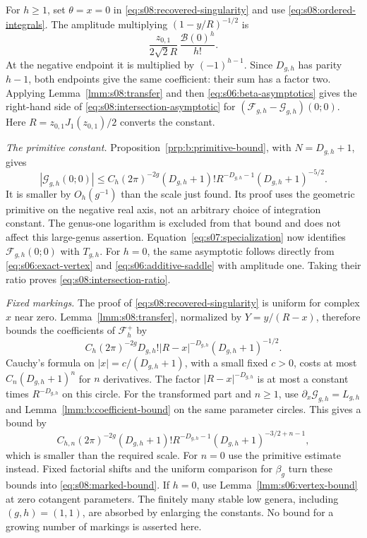 \begin{prf}
For $h\geq1$, set $\theta=x=0$ in
\eqref{eq:s08:recovered-singularity} and use
\eqref{eq:s08:ordered-integrals}. The amplitude multiplying
$(1-y/R)^{-1/2}$ is
\[
 \frac{z_{0,1}}{2\sqrt2 R}\,
                         \frac{\mathcal B(0)^h}{h!}.
\]
At the negative endpoint it is multiplied by $(-1)^{h-1}$.
Since $D_{g,h}$ has parity $h-1$, both endpoints give the same
coefficient: their sum has a factor two. Applying
Lemma~\ref{lmm:s08:transfer} and then
\eqref{eq:s06:beta-asymptotics} gives the right-hand side of
\eqref{eq:s08:intersection-asymptotic} for
$(\mathcal F_{g,h}-\mathcal G_{g,h})(0;0)$.
Here $R=z_{0,1}J_1(z_{0,1})/2$ converts the constant.

\smallskip\noindent
\emph{The primitive constant.}
Proposition~\ref{prp:b:primitive-bound}, with $N=D_{g,h}+1$, gives
\[
 |\mathcal G_{g,h}(0;0)|
 \leq C_h(2\pi)^{-2g}(D_{g,h}+1)!
                  R^{-D_{g,h}-1}(D_{g,h}+1)^{-5/2}.
\]
It is smaller by $O_h(g^{-1})$ than the scale just found.
Its proof uses the geometric primitive on the negative real axis,
not an arbitrary choice of integration constant. The genus-one
logarithm is excluded from that bound and does not affect this
large-genus assertion. Equation~\eqref{eq:s07:specialization}
now identifies $\mathcal F_{g,h}(0;0)$ with $T_{g,h}$.
For $h=0$, the same asymptotic follows directly from
\eqref{eq:s06:exact-vertex} and \eqref{eq:s06:additive-saddle}
with amplitude one. Taking their ratio proves
\eqref{eq:s08:intersection-ratio}.

\smallskip\noindent
\emph{Fixed markings.}
The proof of \eqref{eq:s08:recovered-singularity} is uniform for
complex $x$ near zero. Lemma~\ref{lmm:s08:transfer}, normalized by
$Y=y/(R-x)$, therefore bounds the coefficients of
$\mathcal F_h^+$ by
\[
 C_h(2\pi)^{-2g}D_{g,h}!|R-x|^{-D_{g,h}}
                                      (D_{g,h}+1)^{-1/2}.
\]
Cauchy's formula on $|x|=c/(D_{g,h}+1)$, with a small fixed
$c>0$, costs at most $C_n(D_{g,h}+1)^n$ for $n$ derivatives.
The factor $|R-x|^{-D_{g,h}}$ is at most a constant times
$R^{-D_{g,h}}$ on this circle. For the transformed part and
$n\geq1$, use $\partial_x\mathcal G_{g,h}=L_{g,h}$ and
Lemma~\ref{lmm:b:coefficient-bound} on the same parameter circles.
This gives a bound by
\[
 C_{h,n}(2\pi)^{-2g}(D_{g,h}+1)!R^{-D_{g,h}-1}
                  (D_{g,h}+1)^{-3/2+n-1},
\]
which is smaller than the required scale. For $n=0$ use the
primitive estimate instead. Fixed factorial shifts and the uniform
comparison for $\beta_g$ turn these bounds into
\eqref{eq:s08:marked-bound}. If $h=0$, use
Lemma~\ref{lmm:s06:vertex-bound} at zero cotangent parameters.
The finitely many stable low genera, including $(g,h)=(1,1)$,
are absorbed by enlarging the constants. No bound for a growing
number of markings is asserted here.
\end{prf}
